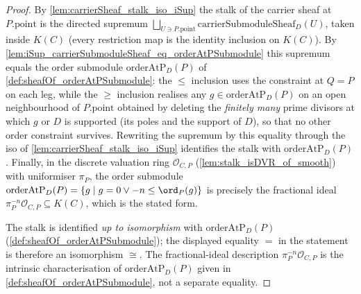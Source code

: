 \begin{proof}
        \leanok
  By \cref{lem:carrierSheaf_stalk_iso_iSup} the stalk of the carrier sheaf at
  \(P.\mathrm{point}\) is the directed supremum
  \(\bigsqcup_{U \ni P.\mathrm{point}} \mathrm{carrierSubmoduleSheaf}_D(U)\),
  taken inside \(K(C)\) (every restriction map is the identity inclusion on
  \(K(C)\)). By
  \cref{lem:iSup_carrierSubmoduleSheaf_eq_orderAtPSubmodule} this supremum equals
  the order submodule \(\mathrm{orderAtP}_D(P)\) of
  \cref{def:sheafOf_orderAtPSubmodule}: the \(\le\) inclusion uses the constraint
  at \(Q = P\) on each leg, while the \(\ge\) inclusion realises any
  \(g \in \mathrm{orderAtP}_D(P)\) on an open neighbourhood of \(P.\mathrm{point}\)
  obtained by deleting the \emph{finitely many} prime divisors at which \(g\) or
  \(D\) is supported (its poles and the support of \(D\)), so that no other order
  constraint survives. Rewriting the supremum by this equality through the iso of
  \cref{lem:carrierSheaf_stalk_iso_iSup} identifies the stalk with
  \(\mathrm{orderAtP}_D(P)\). Finally, in the discrete valuation ring
  \(\mathcal O_{C,P}\) (\cref{lem:stalk_isDVR_of_smooth}) with uniformiser
  \(\pi_P\), the order submodule \(\mathrm{orderAtP}_D(P) = \{g \mid g = 0 \lor
  -n \le \ord_P(g)\}\) is precisely the fractional ideal
  \(\pi_P^{-n}\mathcal O_{C,P} \subseteq K(C)\), which is the stated form.

  The stalk is identified \emph{up to isomorphism} with
  \(\mathrm{orderAtP}_D(P)\) (\cref{def:sheafOf_orderAtPSubmodule}); the
  displayed equality \(=\) in the statement is therefore an isomorphism
  \(\cong\). The fractional-ideal description \(\pi_P^{-n}\mathcal O_{C,P}\)
  is the intrinsic characterisation of \(\mathrm{orderAtP}_D(P)\) given in
  \cref{def:sheafOf_orderAtPSubmodule}, not a separate equality.
\end{proof}

